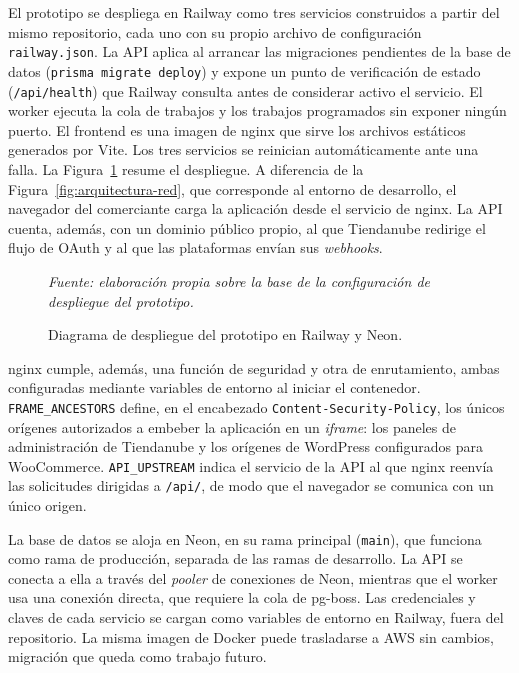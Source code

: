 El prototipo se despliega en Railway como tres servicios construidos a partir del mismo repositorio, cada uno con su propio archivo de configuración \texttt{railway.json}. La API aplica al arrancar las migraciones pendientes de la base de datos (\texttt{prisma migrate deploy}) y expone un punto de verificación de estado (\texttt{/api/health}) que Railway consulta antes de considerar activo el servicio. El worker ejecuta la cola de trabajos y los trabajos programados sin exponer ningún puerto. El frontend es una imagen de nginx que sirve los archivos estáticos generados por Vite. Los tres servicios se reinician automáticamente ante una falla. La Figura~\ref{fig:despliegue} resume el despliegue. A diferencia de la Figura~\ref{fig:arquitectura-red}, que corresponde al entorno de desarrollo, el navegador del comerciante carga la aplicación desde el servicio de nginx. La API cuenta, además, con un dominio público propio, al que Tiendanube redirige el flujo de OAuth y al que las plataformas envían sus \emph{webhooks}.

\begin{figure}[!htbp]
    \centering
    
    \caption{Diagrama de despliegue del prototipo en Railway y Neon.}
    \label{fig:despliegue}

    \smallskip
    \noindent\textit{Fuente: elaboración propia sobre la base de la configuración de despliegue del prototipo.}
\end{figure}

nginx cumple, además, una función de seguridad y otra de enrutamiento, ambas configuradas mediante variables de entorno al iniciar el contenedor. \texttt{FRAME\_ANCESTORS} define, en el encabezado \texttt{Content-Security-Policy}, los únicos orígenes autorizados a embeber la aplicación en un \emph{iframe}: los paneles de administración de Tiendanube y los orígenes de WordPress configurados para WooCommerce. \texttt{API\_UPSTREAM} indica el servicio de la API al que nginx reenvía las solicitudes dirigidas a \texttt{/api/}, de modo que el navegador se comunica con un único origen.

La base de datos se aloja en Neon, en su rama principal (\texttt{main}), que funciona como rama de producción, separada de las ramas de desarrollo. La API se conecta a ella a través del \emph{pooler} de conexiones de Neon, mientras que el worker usa una conexión directa, que requiere la cola de pg-boss. Las credenciales y claves de cada servicio se cargan como variables de entorno en Railway, fuera del repositorio. La misma imagen de Docker puede trasladarse a AWS sin cambios, migración que queda como trabajo futuro.


